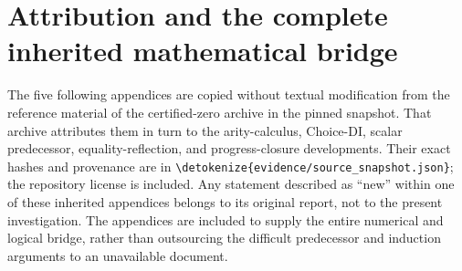 \documentclass[11pt,letterpaper]{article}
\theoremstyle{definition}\newtheorem{definition}[theorem]{Definition}
\theoremstyle{remark}\newtheorem{remark}[theorem]{Remark}
\newcommand{\file}[1]{\expandafter\nolinkurl\expandafter{\detokenize{#1}}}
\begin{document}
\section{Attribution and the complete inherited mathematical bridge}
The five following appendices are copied without textual modification
from the reference material of the certified-zero archive in the pinned
snapshot. That archive attributes them in turn to the arity-calculus,
Choice-DI, scalar predecessor, equality-reflection, and progress-closure
developments. Their exact hashes and provenance are in
\file{evidence/source_snapshot.json}; the repository license is included.
Any statement described as ``new'' within one of these inherited
appendices belongs to its original report, not to the present investigation.
The appendices are included to supply the entire numerical and logical
bridge, rather than outsourcing the difficult predecessor and induction
arguments to an unavailable document.
\end{document}
